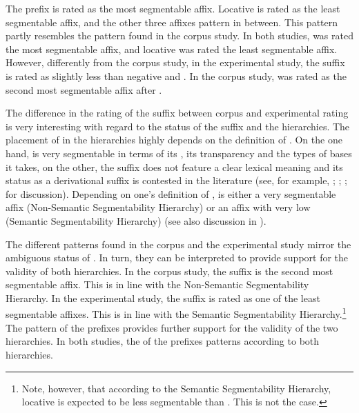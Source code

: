 The prefix  is rated as the most segmentable affix. 
 Locative  is rated as the least segmentable affix, and the other three affixes pattern in between. 
  This pattern partly resembles the pattern found in the corpus study. In both studies,  was rated the most segmentable affix, and locative  was rated the least segmentable affix. 
 However, differently from the corpus study, in the experimental study, the suffix  is rated as slightly less  than negative  and . In the corpus study,  was rated as the second most segmentable affix after .


The difference in the rating of the suffix  between corpus and experimental rating is very interesting with regard to the  status of the suffix and the  hierarchies. The placement of  in the  hierarchies highly depends on the definition of . On the one hand,  is very segmentable in terms of its , its transparency and the types of bases it takes, on the other, the suffix does not feature a clear lexical meaning and its status as a derivational suffix is contested in the literature (see, for example, \citealt{Zwicky.1995}; \citealt{Plag.2003}; \citealt{Giegerich.2012}; \citealt{Bauer.2013} for discussion). Depending on one's definition of ,  is either a very segmentable affix (Non-Semantic Segmentability Hierarchy) or an affix with very low  (Semantic Segmentability Hierarchy) (see also discussion in ). 

The different  patterns found in the corpus and the experimental study mirror the ambiguous  status of . In turn, they can be interpreted to provide support for the validity of both  hierarchies. 
In the corpus study, the suffix  is the second most segmentable affix. This is in line with the Non-Semantic Segmentability Hierarchy. 
In the experimental study, the suffix  is rated as one of the least segmentable affixes. This is in line with the Semantic Segmentability Hierarchy.\footnote{Note, however, that according to the Semantic Segmentability Hierarchy, locative  is expected to be less segmentable than . This is not the case. }
The  pattern of the prefixes provides further support for the validity of the two hierarchies. In both studies, the  of the prefixes patterns according to both hierarchies. 



